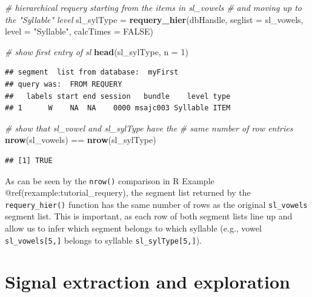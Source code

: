 \documentclass[]{book}
\newenvironment{Shaded}{\begin{snugshade}}{\end{snugshade}}
\newcommand{\KeywordTok}[1]{\textcolor[rgb]{0.13,0.29,0.53}{\textbf{{#1}}}}
\newcommand{\DataTypeTok}[1]{\textcolor[rgb]{0.13,0.29,0.53}{{#1}}}
\newcommand{\DecValTok}[1]{\textcolor[rgb]{0.00,0.00,0.81}{{#1}}}
\newcommand{\StringTok}[1]{\textcolor[rgb]{0.31,0.60,0.02}{{#1}}}
\newcommand{\CommentTok}[1]{\textcolor[rgb]{0.56,0.35,0.01}{\textit{{#1}}}}
\newcommand{\OtherTok}[1]{\textcolor[rgb]{0.56,0.35,0.01}{{#1}}}
\newcommand{\NormalTok}[1]{{#1}}
\theoremstyle{definition}
\theoremstyle{definition}
\theoremstyle{definition}
\theoremstyle{remark}
\begin{document}
\begin{Shaded}
\begin{Highlighting}[]
\CommentTok{# hierarchical requery starting from the items in sl_vowels}
\CommentTok{# and moving up to the "Syllable" level}
\NormalTok{sl_sylType =}\StringTok{ }\KeywordTok{requery_hier}\NormalTok{(dbHandle,}
                          \DataTypeTok{seglist =} \NormalTok{sl_vowels,}
                          \DataTypeTok{level =} \StringTok{"Syllable"}\NormalTok{,}
                          \DataTypeTok{calcTimes =} \OtherTok{FALSE}\NormalTok{)}

\CommentTok{# show first entry of sl}
\KeywordTok{head}\NormalTok{(sl_sylType, }\DataTypeTok{n =} \DecValTok{1}\NormalTok{)}
\end{Highlighting}
\end{Shaded}

\begin{verbatim}
## segment  list from database:  myFirst 
## query was:  FROM REQUERY 
##   labels start end session   bundle    level type
## 1      W    NA  NA    0000 msajc003 Syllable ITEM
\end{verbatim}

\begin{Shaded}
\begin{Highlighting}[]
\CommentTok{# show that sl_vowel and sl_sylType have the}
\CommentTok{# same number of row entries}
\KeywordTok{nrow}\NormalTok{(sl_vowels) ==}\StringTok{ }\KeywordTok{nrow}\NormalTok{(sl_sylType)}
\end{Highlighting}
\end{Shaded}

\begin{verbatim}
## [1] TRUE
\end{verbatim}

As can be seen by the \texttt{nrow()} comparison in R Example
@ref(rexample:tutorial\_requery), the segment list returned by the
\texttt{requery\_hier()} function has the same number of rows as the
original \texttt{sl\_vowels} segment list. This is important, as each
row of both segment lists line up and allow us to infer which segment
belongs to which syllable (e.g., vowel \texttt{sl\_vowels{[}5,{]}}
belongs to syllable \texttt{sl\_sylType{[}5,{]}}).

\section{Signal extraction and
exploration}\label{section:tutorial_sigExtrAndExpl}
\end{document}

